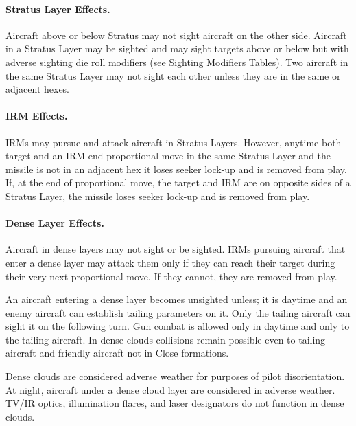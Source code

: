 \begin{advancedrules}
\paragraph{Stratus Layer Effects.} Aircraft  above or below Stratus may not sight aircraft  on the other side. Aircraft in a Stratus Layer may be sighted and may sight targets above or below but with adverse sighting die roll modifiers (see Sighting Modifiers Tables). Two aircraft in the same Stratus Layer may not sight each other unless they are in the same or adjacent hexes. 

\paragraph{IRM Effects.} IRMs may pursue and attack aircraft in Stratus Layers. However, anytime both target and an IRM end  proportional move in the same Stratus Layer and the missile is not in an adjacent hex it loses seeker lock-up and is removed from play. If, at the end of  proportional move, the target and IRM are on opposite sides of a Stratus Layer, the missile loses seeker lock-up and is removed from play.

\paragraph{Dense Layer Effects.} Aircraft in dense layers may not sight or be sighted. IRMs pursuing aircraft that enter a dense layer may attack them only if they can reach their target during their very next proportional move. If they cannot, they are removed from play.

An aircraft entering a dense layer becomes unsighted unless; it is daytime and an enemy aircraft can establish tailing parameters on it. Only the tailing aircraft can sight it on the following turn. Gun combat is allowed only in daytime and only to the tailing aircraft. In dense clouds collisions remain possible even to tailing aircraft and friendly aircraft not in Close formations.

Dense clouds are considered adverse weather for purposes of pilot disorientation. At night, aircraft under a dense cloud layer are considered in adverse weather. TV/IR optics, illumination flares, and laser designators do not function in dense clouds.


\end{advancedrules}
